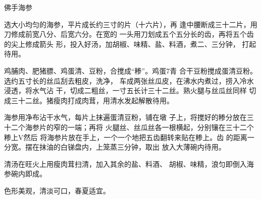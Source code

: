 \begin{recipe}{佛手海参}

\ingredients



\cooking

\step 选大小均匀的海参，平片成长约三寸的片（十六片），再 逢中腰断成三十二片，用刀修成前宽八分、后宽六分。在宽的 一头用刀划成五个五分长的齿，再将五个齿的尖上修成箭头 形，投入好汤，加胡椒、味精、盐、料酒，煮二、三分钟， 打起待用。

鸡脯肉、肥猪膘、鸡蛋清、豆粉，合搅成“糁”。鸡蛋7青 合干豆粉搅成蛋清豆粉。选约五寸长的丝瓜刮去粗皮，洗净， 车成两张丝瓜皮，在沸水内煮过，捞入冷水浸透，将水气沾 干，切成二粗丝，一寸五长计三十二丝。熟火腿与丝瓜丝同样 切成三十二丝。猪瘦肉打成肉茸，用清水发起解散待用。

\step 海参用净布沾干水气，每片上抹遍蛋清豆粉，铺在墩 子上，将搅好的糁分放在三十二个海参片的窄的一端；再将 火腿丝、丝瓜丝各一根横起，分别镶在三十二个糁上V然后 将海参片放在手上，一个一个地把五齿翻转来贴在糁上。齿 的距离一分宽。摆在抹油的白锑盘内，上笼蒸三分钟，取出 放入大薄碗内待用。

\step 清汤在旺火上用瘦肉茸扫清，加入其余的盐、料酒、 胡椒、味精，浪匀即倒入海参碗内即成。

\notes

色形美观，清淡可口，春夏适宜。

\end{recipe}


